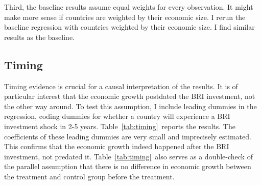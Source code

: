 \documentclass[10pt,a4paper]{article}
\begin{document}
Third, the baseline results assume equal weights for every observation.
It might make more sense if countries are weighted by their economic
size. I rerun the baseline regression with countries weighted by their
economic size. I find similar results as the baseline.

\par\null

\subsection{Timing~}

{\label{178154}}

Timing evidence is crucial for a causal interpretation of the results.
It is of particular interest that the economic growth postdated the BRI
investment, not the other way around. To test this assumption, I include
leading dummies in the regression, coding dummies for whether a country
will experience a BRI investment shock in 2-5 years.
Table~{\ref{tab:timing}}~reports the results. The
coefficients of these leading dummies are very small and imprecisely
estimated. This confirms that the economic growth indeed happened after
the BRI investment, not predated it.
Table~{\ref{tab:timing}}~also serves as a double-check
of the parallel assumption that there is no difference in economic
growth between the treatment and control group before the treatment. ~
\end{document}
